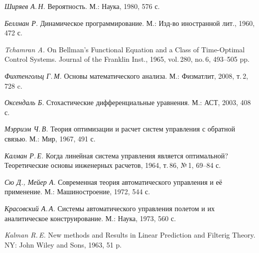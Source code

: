 






\begin{thebibliography}{wlab}


\emph{Ширяев А.\,Н.}
\newblock Вероятность.
\newblock М.: Наука, 1980, 576 с.

\emph{Беллман Р.}
\newblock Динамическое программирование.
\newblock М.: Изд-во иностранной лит., 1960, 472 с.

\emph{Tchamran A.}
\newblock On Bellman's Functional Equation and a Class of Time-Optimal Control Systems.
\newblock Journal of the Franklin Inst., 1965, vol.\,280, no.\,6, 493--505 pp.

\emph{Фихтенгольц Г.\,М.}
\newblock Основы математического анализа.
\newblock М.: Физматлит, 2008, т.\,2, 728 c.

\emph{Оксендаль Б.}
\newblock Стохастические дифференциальные уравнения.
\newblock М.: АСТ, 2003, 408 с.

\emph{Мэрриэм Ч.\,В.}
\newblock Теория оптимизации и расчет систем управления с обратной связью.
\newblock М.: Мир, 1967, 491 с.

\emph{Калман Р.\,Е.}
\newblock Когда линейная система управления является оптимальной?
\newblock Теоретические основы инженерных расчетов, 1964, т.\,86, №\,1, 69--84 с.

\newpage

\emph{Сю Д., Мейер А.}
\newblock Современная теория автоматического управления и её применение.
\newblock М.: Машиностроение, 1972, 544 с.

\emph{Красовский А.\,А.}
\newblock Системы автоматического управления полетом и их аналитическое конструирование.
\newblock М.: Наука, 1973, 560 с.

\emph{Kalman R.\,E.}
\newblock New methods and Results in Linear Prediction and Filterig Theory.
\newblock NY: John Wiley and Sons, 1963, 51 p.


\end{thebibliography}
